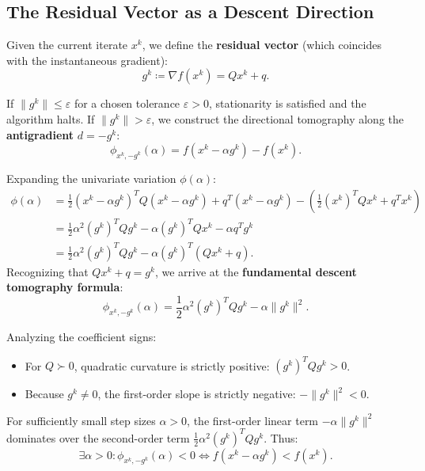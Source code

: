 \subsection{The Residual Vector as a Descent Direction}
Given the current iterate $x^k$, we define the \textbf{residual vector} (which coincides with the instantaneous gradient):
\begin{equation}
    g^k \coloneqq \nabla f(x^k) = Q x^k + q.
\end{equation}

If $\|g^k\| \le \varepsilon$ for a chosen tolerance $\varepsilon > 0$, stationarity is satisfied and the algorithm halts.
If $\|g^k\| > \varepsilon$, we construct the directional tomography along the \textbf{antigradient} $d = -g^k$:
\begin{equation}
    \phi_{x^k, -g^k}(\alpha) = f(x^k - \alpha g^k) - f(x^k).
\end{equation}

Expanding the univariate variation $\phi(\alpha)$:
\begin{align}
    \phi(\alpha) &= \frac{1}{2} (x^k - \alpha g^k)^T Q (x^k - \alpha g^k) + q^T (x^k - \alpha g^k) - \left( \frac{1}{2} (x^k)^T Q x^k + q^T x^k \right) \nonumber \\
    &= \frac{1}{2} \alpha^2 (g^k)^T Q g^k - \alpha (g^k)^T Q x^k - \alpha q^T g^k \nonumber \\
    &= \frac{1}{2} \alpha^2 (g^k)^T Q g^k - \alpha (g^k)^T (Q x^k + q).
\end{align}
Recognizing that $Q x^k + q = g^k$, we arrive at the \textbf{fundamental descent tomography formula}:
\begin{equation}
    \phi_{x^k, -g^k}(\alpha) = \frac{1}{2} \alpha^2 (g^k)^T Q g^k - \alpha \|g^k\|^2.
    \label{eq:tomography-antigradient-en}
\end{equation}

Analyzing the coefficient signs:
\begin{itemize}
    \item For $Q \succ 0$, quadratic curvature is strictly positive: $(g^k)^T Q g^k > 0$.
    \item Because $g^k \neq 0$, the first-order slope is strictly negative: $-\|g^k\|^2 < 0$.
\end{itemize}
For sufficiently small step sizes $\alpha > 0$, the first-order linear term $-\alpha \|g^k\|^2$ dominates over the second-order term $\frac{1}{2} \alpha^2 (g^k)^T Q g^k$. Thus:
\begin{equation}
    \exists \alpha > 0 : \phi_{x^k, -g^k}(\alpha) < 0 \iff f(x^k - \alpha g^k) < f(x^k).
\end{equation}

